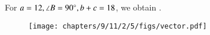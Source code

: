 For $a = 12, \angle B = 90\degree, b+c = 18$, we obtain 
		.
	\begin{figure}[H]
		\centering
 \texttt{[image: chapters/9/11/2/5/figs/vector.pdf]}
		\caption{}
		\label{fig:9/11/2/5}
  	\end{figure}
